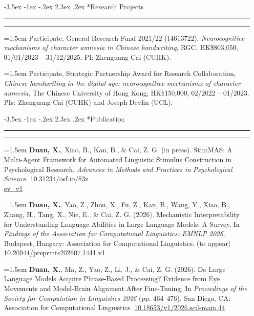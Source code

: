 \documentclass[11pt,a4paper]{article}
\makeatletter
\renewcommand\section{\@startsection{section}{1}{\z@}%
  {-3.5ex \@plus -1ex \@minus -.2ex}%
  {2.3ex \@plus.2ex}%
  {\normalfont\normalsize\bfseries}}
\makeatother
\begin{document}
\vspace{-1.5em} 
\section*{Research Projects}
\vspace{-.5em}
\hrule
\vspace{0.3ex}
\hrule

\hangindent=1.5em  Participate, General Research Fund 2021/22 (14613722), \textit{Neurocognitive mechanisms of character amnesia in Chinese handwriting}, RGC, HK\$803,050, 01/01/2023 -- 31/12/2025. PI: Zhenguang Cai (CUHK).

\hangindent=1.5em  Participate, Strategic Partnership Award for Research Collaboration, \textit{Chinese handwriting in the digital age: neurocognitive mechanisms of character amnesia}, The Chinese University of Hong Kong, HK\$150,000, 02/2022 -- 01/2023. PIs: Zhenguang Cai (CUHK) and Joseph Devlin (UCL).

\vspace{-1.5em} 
\section*{Publication}
\vspace{-.5em}
\hrule
\vspace{0.3ex}
\hrule
\hangindent=1.5em  \textbf{Duan, X.}, Xiao, B., Kan, B., \& Cai, Z. G. (in press). StimMAS: A Multi-Agent Framework for Automated Linguistic Stimulus Construction in Psychological Research. \textit{Advances in Methods and Practices in Psychological Science}. \href{https://doi.org/10.31234/osf.io/83zev_v1}{10.31234/osf.io/83z\\ev_v1}

\hangindent=1.5em  \textbf{Duan, X.}, Yao, Z., Zhou, X., Fu, Z., Kan, B., Wang, Y., Xiao, B., Zhang, H., Tang, X., Nie, E., \& Cai, Z. G. (2026). Mechanistic Interpretability for Understanding Language Abilities in Large Language Models: A Survey. In \textit{Findings of the Association for Computational Linguistics: EMNLP 2026}. Budapest, Hungary: Association for Computational Linguistics. (to appear) \href{https://doi.org/10.20944/preprints202607.1441.v1}{10.20944/preprints202607.1441.v1}

\hangindent=1.5em  \textbf{Duan, X.}, Ma, Z., Yao, Z., Li, J., \& Cai, Z. G. (2026). Do Large Language Models Acquire Phrase-Based Processing? Evidence from Eye Movements and Model-Brain Alignment After Fine-Tuning. In \textit{Proceedings of the Society for Computation in Linguistics 2026} (pp. 464--476). San Diego, CA: Association for Computational Linguistics. \href{https://doi.org/10.18653/v1/2026.scil-main.44}{10.18653/v1/2026.scil-main.44}
\end{document}
